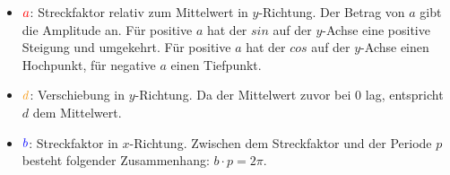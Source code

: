 \iftoggle{qrcode}{\setlength{\qrheight}{2.5cm}}{\setlength{\qrheight}{0cm}}%
\newlength{\trigoAllg}%
\setlength{\trigoAllg}{\linewidth-\qrheight}%
\begin{minipage}{\linewidth}
    \iftoggle{qrcode}{\adjustbox{valign=t, padding =0ex 0ex 0ex 0ex}{\begin{minipage}{\qrheight}%
                \href{https://www.geogebra.org/m/kuhfc6gm}{\texttt{[image: \\trigonometrie/pics/AllgSinCosQR.png]}}%
    \end{minipage}}}{}%
\end{minipage}%

\iftoggle{qrcode}{}{\bigskip}%

\begin{itemize}
	\item \(\textcolor{red}{a}\): \textcolor{loes}{Streckfaktor relativ zum Mittelwert in \(y\)-Richtung. Der Betrag von \(a\) gibt die Amplitude an. Für positive \(a\) hat der \(sin\) auf der \(y\)-Achse eine positive Steigung und umgekehrt. Für positive \(a\) hat der \(cos\) auf der \(y\)-Achse einen Hochpunkt, für negative \(a\) einen Tiefpunkt.}

    \bigskip

	\item \(\textcolor{YellowOrange}{d}\): \textcolor{loes}{Verschiebung in \(y\)-Richtung. Da der Mittelwert zuvor bei \(0\) lag, entspricht \(d\) dem Mittelwert.}

    \bigskip

	\item \(\textcolor{blue}{b}\): \textcolor{loes}{Streckfaktor in \(x\)-Richtung. Zwischen dem Streckfaktor und der Periode \(p\) besteht folgender Zusammenhang: \(b\cdot p=2\pi\).}

    \bigskip

\end{itemize}

